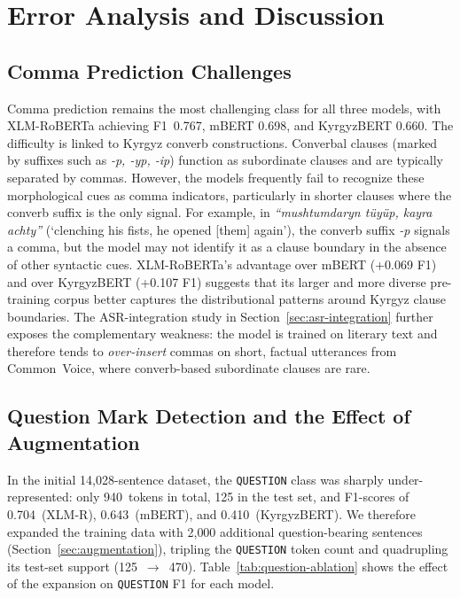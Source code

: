 \documentclass[manuscript, review]{acmart}
\begin{document}
\section{Error Analysis and Discussion}
\label{sec:discussion}

\subsection{Comma Prediction Challenges}

Comma prediction remains the most challenging class for all three models, with XLM-RoBERTa achieving F1~0.767, mBERT 0.698, and KyrgyzBERT 0.660. The difficulty is linked to Kyrgyz converb constructions. Converbal clauses (marked by suffixes such as \textit{-p, -yp, -ip}) function as subordinate clauses and are typically separated by commas. However, the models frequently fail to recognize these morphological cues as comma indicators, particularly in shorter clauses where the converb suffix is the only signal. For example, in \textit{``mushtumdaryn t\"{u}y\"{u}p, kayra achty''} (`clenching his fists, he opened [them] again'), the converb suffix \textit{-p} signals a comma, but the model may not identify it as a clause boundary in the absence of other syntactic cues. XLM-RoBERTa's advantage over mBERT (+0.069 F1) and over KyrgyzBERT (+0.107 F1) suggests that its larger and more diverse pre-training corpus better captures the distributional patterns around Kyrgyz clause boundaries. The ASR-integration study in Section~\ref{sec:asr-integration} further exposes the complementary weakness: the model is trained on literary text and therefore tends to \emph{over-insert} commas on short, factual utterances from Common~Voice, where converb-based subordinate clauses are rare.

\subsection{Question Mark Detection and the Effect of Augmentation}

In the initial 14{,}028-sentence dataset, the \texttt{QUESTION} class was sharply under-represented: only 940~tokens in total, 125 in the test set, and F1-scores of 0.704~(XLM-R), 0.643~(mBERT), and 0.410~(KyrgyzBERT). We therefore expanded the training data with 2{,}000 additional question-bearing sentences (Section~\ref{sec:augmentation}), tripling the \texttt{QUESTION} token count and quadrupling its test-set support (125~$\to$~470). Table~\ref{tab:question-ablation} shows the effect of the expansion on \texttt{QUESTION} F1 for each model.
\end{document}
